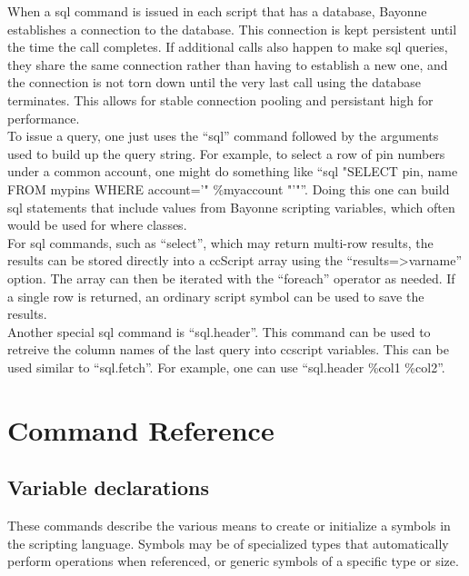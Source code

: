 \documentclass[a4paper,12pt]{article}
\begin{document}
When a sql command is issued in each script that has a database, Bayonne
establishes a connection to the database. This connection is kept
persistent until the time the call completes.  If additional calls also
happen to make sql queries, they share the same connection rather than
having to establish a new one, and the connection is not torn down until
the very last call using the database terminates.  This allows for
stable connection pooling and persistant high for performance. \\

To issue a query, one just uses the ``sql'' command followed by the arguments
used to build up the query string.  For example, to select a row of pin
numbers under a common account, one might do something like
``sql "SELECT pin, name FROM mypins WHERE account='" \%myaccount "'"''.
Doing this one can build sql statements that include values from Bayonne
scripting variables, which often would be used for where classes. \\

For sql commands, such as ``select'', which may return multi-row
results, the results can be stored directly into a ccScript array using
the ``results=>varname'' option.  The array can then be iterated with
the ``foreach'' operator as needed.  If a single row is returned, an
ordinary script symbol can be used to save the results. \\

Another special sql command is ``sql.header''.  This command can be used
to retreive the column names of the last query into ccscript variables.
This can be used similar to ``sql.fetch''.  For example, one can use
``sql.header \%col1 \%col2''. \\                                                

\section{Command Reference}

\subsection{Variable declarations}

These commands describe the various means to create or initialize a
symbols in the scripting language.  Symbols may be of specialized types
that automatically perform operations when referenced, or generic symbols
of a specific type or size.
\end{document}
